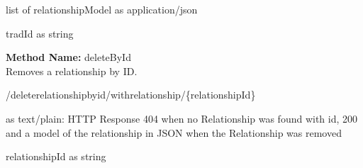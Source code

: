 \begin{response}
list of relationshipModel as application/json
\end{response}
\begin{parameter}
tradId as string
\end{parameter}
\textbf{Method Name: }deleteById \\ Removes a relationship by ID.
\begin{delete}
/deleterelationshipbyid/withrelationship/\{relationshipId\}
\end{delete}
\begin{response}
 as text/plain: HTTP Response 404 when no Relationship was found with id, 200 and a model of the relationship in JSON when the Relationship was removed
\end{response}
\begin{parameter}
relationshipId as string
\end{parameter}
